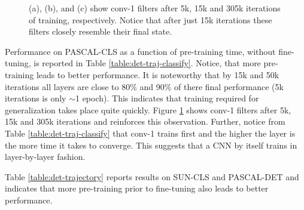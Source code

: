 \begin{figure}[t!]
\caption{(a), (b), and (c) show conv-1 filters after 5k, 15k and 305k iterations of training, respectively. Notice that after just 15k iterations these filters closely resemble their final state.}

\label{fig:conv1}
\end{figure}

Performance on PASCAL-CLS as a function of pre-training time, without fine-tuning, is reported in Table \ref{table:det-traj-classify}. Notice, that more pre-training leads to better performance. It is noteworthy that by 15k and 50k iterations all layers are close to 80\% and  90\% of there final performance (5k iterations is only $\sim$1 epoch). This indicates that training required for generalization takes place quite quickly. Figure \ref{fig:conv1} shows conv-1 filters after 5k, 15k and 305k iterations and reinforces this observation. Further, notice from Table \ref{table:det-traj-classify} that conv-1 trains first and the higher the layer is the more time it takes to converge. This suggests that a CNN by itself trains in layer-by-layer fashion.   

Table \ref{table:det-trajectory} reports results on SUN-CLS and PASCAL-DET and indicates that more pre-training prior to fine-tuning also leads to better performance.  



